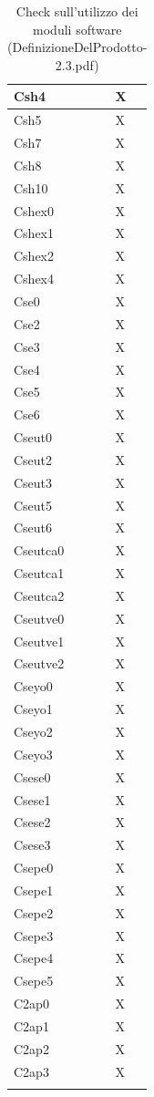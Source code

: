 \begin{footnotesize}
\begin{longtable}{|p{}|p{}|}
Csh4 &X\\\hline 
Csh5 &X\\\hline 
Csh7 &X\\\hline 
Csh8 &X\\\hline 
Csh10 &X\\\hline 
Cshex0 &X\\\hline 
Cshex1 &X\\\hline 
Cshex2 &X\\\hline 
Cshex4 &X\\\hline 
Cse0 &X\\\hline 
Cse2 &X\\\hline 
Cse3 &X\\\hline 
Cse4 &X\\\hline 
Cse5 &X\\\hline 
Cse6 &X\\\hline 
Cseut0 &X\\\hline 
Cseut2 &X\\\hline 
Cseut3 &X\\\hline  
Cseut5 &X\\\hline
Cseut6 &X\\\hline
Cseutca0 &X\\\hline
Cseutca1 &X\\\hline
Cseutca2 &X\\\hline
Cseutve0 &X\\\hline
Cseutve1 &X\\\hline
Cseutve2 &X\\\hline
Cseyo0 &X\\\hline
Cseyo1 &X\\\hline
Cseyo2 &X\\\hline
Cseyo3 &X\\\hline
Csese0 &X\\\hline 
Csese1 &X\\\hline 
Csese2 &X\\\hline 
Csese3 &X\\\hline 
Csepe0 &X\\\hline 
Csepe1 &X\\\hline 
Csepe2 &X\\\hline 
Csepe3 &X\\\hline 
Csepe4 &X\\\hline 
Csepe5 &X\\\hline
C2ap0 &X\\\hline
C2ap1 &X\\\hline
C2ap2 &X\\\hline
C2ap3 &X\\\hline

\caption{Check sull'utilizzo dei moduli software
(DefinizioneDelProdotto-2.3.pdf)}
\end{longtable}
\end{footnotesize}


